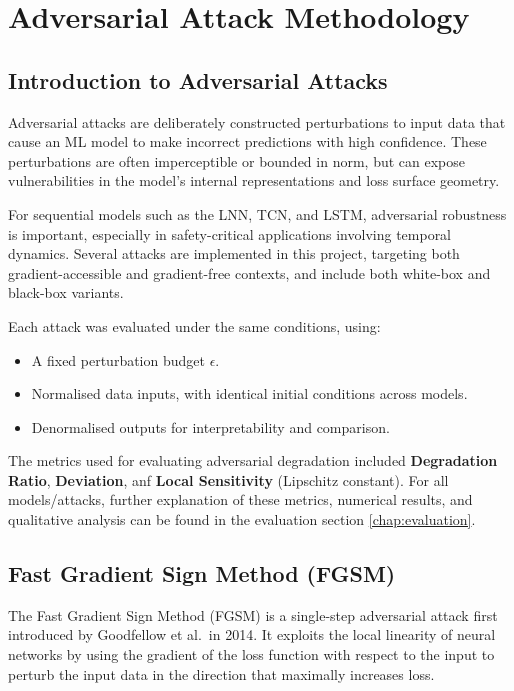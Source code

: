 \chapter{Adversarial Attack Methodology}

\section{Introduction to Adversarial Attacks}

Adversarial attacks are deliberately constructed perturbations to input data that cause an ML model to make incorrect predictions with high confidence. These perturbations are often imperceptible or bounded in norm, but can expose vulnerabilities in the model's internal representations and loss surface geometry.

For sequential models such as the LNN, TCN, and LSTM, adversarial robustness is important, especially in safety-critical applications involving temporal dynamics. Several attacks are implemented in this project, targeting both gradient-accessible and gradient-free contexts, and include both white-box and black-box variants.

Each attack was evaluated under the same conditions, using:
\begin{itemize}
    \item A fixed perturbation budget $\epsilon$.
    \item Normalised data inputs, with identical initial conditions across models.
    \item Denormalised outputs for interpretability and comparison.
\end{itemize}

The metrics used for evaluating adversarial degradation included \textbf{Degradation Ratio}, \textbf{Deviation}, anf \textbf{Local Sensitivity} (Lipschitz constant). For all models/attacks, further explanation of these metrics, numerical results, and qualitative analysis can be found in the evaluation section \ref{chap:evaluation}.

\section{Fast Gradient Sign Method (FGSM)}

The Fast Gradient Sign Method (FGSM) is a single-step adversarial attack first introduced by Goodfellow et al.\ in 2014. It exploits the local linearity of neural networks by using the gradient of the loss function with respect to the input to perturb the input data in the direction that maximally increases loss.

